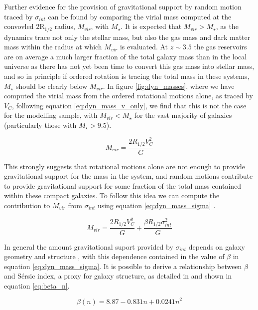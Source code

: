 \documentclass[fleqn,usenatbib]{mn2e}
\newcommand{\Sers}{S\'{e}rsic }
\begin{document}
Further evidence for the provision of gravitational support by random motion traced by $\sigma_{int}$ can be found by comparing the virial mass computed at the convovled 2R$_{1/2}$ radius, $M_{vir}$, with $M_{\star}$.
It is expected that $M_{vir} > M_{\star}$, as the dynamics trace not only the stellar mass, but also the gas mass and dark matter mass within the radius at which $M_{vir}$ is evaluated.
At $z \sim 3.5$ the gas reservoirs are on average a much larger fraction of the total galaxy mass than in the local universe \citep[e.g.][]{Tacconi2013,Saintonge2013,Wisnioski2015} as there has not yet been time to convert this gas mass into stellar mass, and so in principle if ordered rotation is tracing the total mass in these systems, $M_{\star}$ should be clearly below $M_{vir}$.
In figure \ref{fig:dyn_masses}, where we have computed the virial mass from the ordered rotational motions alone, as traced by $V_{C}$, following equation \ref{eq:dyn_mass_v_only}, we find that this is not the case for the modelling sample, with $M_{vir} < M_{\star}$ for the vast majority of galaxies (particularly those with $M_{\star} > 9.5$).

\begin{equation}\label{eq:dyn_mass_v_only}
   M_{vir} = \frac{2R_{1/2}V_{C}^{2}}{G}
\end{equation}

This strongly suggests that rotational motions alone are not enough to provide gravitational support for the mass in the system, and random motions contribute to provide gravitational support for some fraction of the total mass contained within these compact galaxies.
To follow this idea we can compute the contribution to $M_{vir}$ from $\sigma_{int}$ using equation \ref{eq:dyn_mass_sigma} \citep[e.g.][]{Cappellari2006}.

\begin{equation}\label{eq:dyn_mass_sigma}
   M_{vir} = \frac{2R_{1/2}V_{C}^{2}}{G} + \frac{\beta R_{1/2}\sigma_{int}^{2}}{G}
\end{equation}     

In general the amount gravitational suport provided by $\sigma_{int}$ depends on galaxy geometry and structure \citep[e.g.][]{Cappellari2006,Belli2014}, with this dependence contained in the value of $\beta$ in equation \ref{eq:dyn_mass_sigma}.
It is possible to derive a relationship between $\beta$ and \Sers index, a proxy for galaxy structure, as detailed in \cite{Cappellari2006} and shown in equation \ref{eq:beta_n}.

\begin{equation}\label{eq:beta_n}
   \beta(n) = 8.87 - 0.831n + 0.0241n^{2}
\end{equation} 
\end{document}
